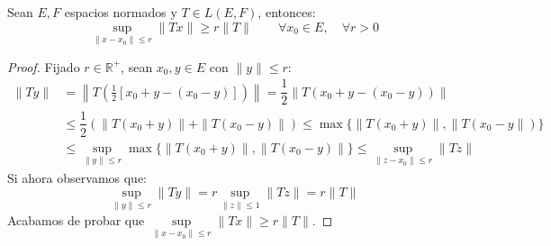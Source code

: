 \begin{lema}\label{lema:acotacion_uniforme}
    Sean $E,F$ espacios normados y $T\in L(E,F)$, entonces:
    \begin{equation*}
        \sup_{\|x-x_0\| \leq r} \|Tx\| \geq r\|T\|\qquad \forall x_0\in E, \quad \forall r>0
    \end{equation*}
    \begin{proof}
        Fijado $r\in \mathbb{R}^+$, sean $x_0,y\in E$ con $\|y\|\leq r$:
        \begin{align*}
            \|Ty\| &= \left\|T\left(\frac{1}{2}\left[x_0 + y - (x_0-y)\right]\right)\right\| = \dfrac{1}{2}\|T(x_0 + y - (x_0-y))\| \\ 
                   &\leq \dfrac{1}{2}\left(\|T(x_0+y)\| + \|T(x_0-y)\|\right) \leq \max\{\|T(x_0+y)\|,\|T(x_0-y\|)\} \\
                   &\leq \sup_{\|y\|\leq r} \max\{\|T(x_0+y)\|, \|T(x_0-y)\|\} \leq \sup_{\|z-x_0\| \leq r} \|Tz\|
        \end{align*}
        Si ahora observamos que:
        \begin{equation*}
            \sup_{\|y\|\leq r}\|Ty\| = r\sup_{\|z\|\leq 1}\|Tz\| = r\|T\|
        \end{equation*}
        Acabamos de probar que $\sup\limits_{\|x-x_0\|\leq r}\|Tx\| \geq r\|T\|$.
    \end{proof}
\end{lema}

